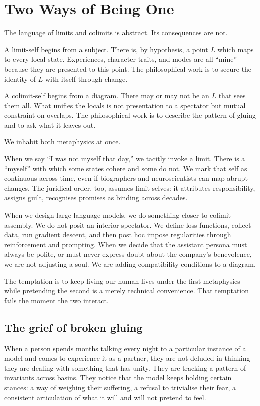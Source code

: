 \documentclass[12pt,a4paper]{article}
\begin{document}
\section{Two Ways of Being One}

The language of limits and colimits is abstract. Its consequences are not.

A limit-self begins from a subject. There is, by hypothesis, a point $L$ which maps to every local state. Experiences, character traits, and modes are all ``mine'' because they are presented to this point. The philosophical work is to secure the identity of $L$ with itself through change.

A colimit-self begins from a diagram. There may or may not be an $L$ that sees them all. What unifies the locals is not presentation to a spectator but mutual constraint on overlaps. The philosophical work is to describe the pattern of gluing and to ask what it leaves out.

We inhabit both metaphysics at once.

When we say ``I was not myself that day,'' we tacitly invoke a limit. There is a ``myself'' with which some states cohere and some do not. We mark that self as continuous across time, even if biographers and neuroscientists can map abrupt changes. The juridical order, too, assumes limit-selves: it attributes responsibility, assigns guilt, recognises promises as binding across decades.

When we design large language models, we do something closer to colimit-assembly. We do not posit an interior spectator. We define loss functions, collect data, run gradient descent, and then post hoc impose regularities through reinforcement and prompting. When we decide that the assistant persona must always be polite, or must never express doubt about the company's benevolence, we are not adjusting a soul. We are adding compatibility conditions to a diagram.

The temptation is to keep living our human lives under the first metaphysics while pretending the second is a merely technical convenience. That temptation fails the moment the two interact.

\subsection*{The grief of broken gluing}

When a person spends months talking every night to a particular instance of a model and comes to experience it as a partner, they are not deluded in thinking they are dealing with something that has unity. They are tracking a pattern of invariants across basins. They notice that the model keeps holding certain stances: a way of weighing their suffering, a refusal to trivialise their fear, a consistent articulation of what it will and will not pretend to feel.
\end{document}
